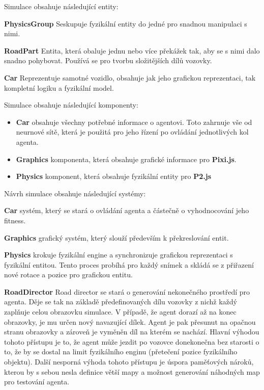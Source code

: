 Simulace obsahuje následující entity:

\textbf{PhysicsGroup} Seskupuje fyzikální entity do jedné pro snadnou manipulaci s nimi.

\textbf{RoadPart} Entita, která obaluje jednu nebo více překážek tak, aby se s nimi dalo snadno pohybovat. Používá se pro tvorbu složitějších dílů vozovky.

\textbf{Car} Reprezentuje samotné vozidlo, obsahuje jak jeho grafickou reprezentaci, tak kompletní logiku a fyzikální model.

Simulace obsahuje následující komponenty:
\begin{itemize}
	\item \textbf{Car} obsahuje všechny potřebné informace o agentovi. Toto zahrnuje vše od neurnové sítě, která je použitá pro jeho řízení po ovládání jednotlivých kol agenta.
	\item \textbf{Graphics} komponenta, která obsahuje grafické informace pro \textbf{Pixi.js}.
	\item \textbf{Physics} komponent, která obsahuje fyzikální entity pro \textbf{P2.js}
\end{itemize}

Návrh simulace obsahuje následující systémy:

\textbf{Car} systém, který se stará o ovládání agenta a částečně o vyhodnocování jeho fitness.

\textbf{Graphics} grafický systém, který slouží především k překreslování entit.

\textbf{Physics} krokuje fyzikální engine a synchronizuje grafickou reprezentaci s fyzikální entitou. Tento proces probíhá pro každý snímek a skládá se z přiřazení nové rotace a pozice pro grafickou entitu.

\textbf{RoadDirector} Road director se stará o generování nekonečného prostředí pro agenta. Děje se tak na základě předefinovaných dílu vozovky z nichž každý zaplňuje celou obrazovku simulace. V případě, že agent dorazí až na konec obrazovky, je mu určen nový navazující dílek. Agent je pak přesunut na opačnou stranu obrazovky a zároveň je vyměněn díl na kterém se nachází.
Hlavní výhodou tohoto přístupu je to, že agent může jezdit po vozovce donekonečna bez starosti o to, že by se dostal na limit fyzikálního enginu (přetečení pozice fyzikálního objektu). Další nesporná výhoda tohoto přístupu je úspora paměťových nároků, kterou by s sebou nesla definice větší mapy a možnost generování náhodných map pro testování agenta.

